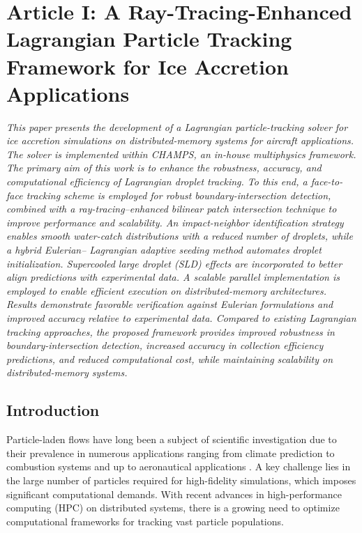 \chapter{Article I: A Ray-Tracing-Enhanced Lagrangian Particle Tracking Framework for Ice Accretion Applications}\label{sec:lagArticle}

\textit
{
This paper presents the development of a Lagrangian particle-tracking solver for ice accretion simulations on distributed-memory systems for aircraft applications. The solver is implemented within CHAMPS, an in-house multiphysics framework. The primary aim of this work is to enhance the robustness, accuracy, and computational efficiency of Lagrangian droplet tracking. To this end, a face-to-face tracking scheme is employed for robust boundary-intersection detection, combined with a ray-tracing–enhanced bilinear patch intersection technique to improve performance and scalability. An impact-neighbor identification strategy enables smooth water-catch distributions with a reduced number of droplets, while a hybrid Eulerian– Lagrangian adaptive seeding method automates droplet initialization. Supercooled large droplet (SLD) effects are incorporated to better align predictions with experimental data. A scalable parallel implementation is employed to enable efficient execution on distributed-memory architectures. Results demonstrate favorable verification against Eulerian formulations and improved accuracy relative to experimental data. Compared to existing Lagrangian tracking approaches, the proposed framework provides improved robustness in boundary-intersection detection, increased accuracy in collection efficiency predictions, and reduced computational cost, while maintaining scalability on distributed-memory systems.
}

\section{Introduction}
Particle-laden flows have long been a subject of scientific investigation due to their prevalence in numerous applications ranging from climate prediction \cite{climate} to combustion systems \cite{vaango2015cfd} and up to aeronautical applications \cite{rendall2014finite, bellosta2023lagrangian, BALDAN2023105856, sabri2024study}. A key challenge lies in the large number of particles required for high-fidelity simulations, which imposes significant computational demands. With recent advances in high-performance computing (HPC) on distributed systems, there is a growing need to optimize computational frameworks for tracking vast particle populations.

